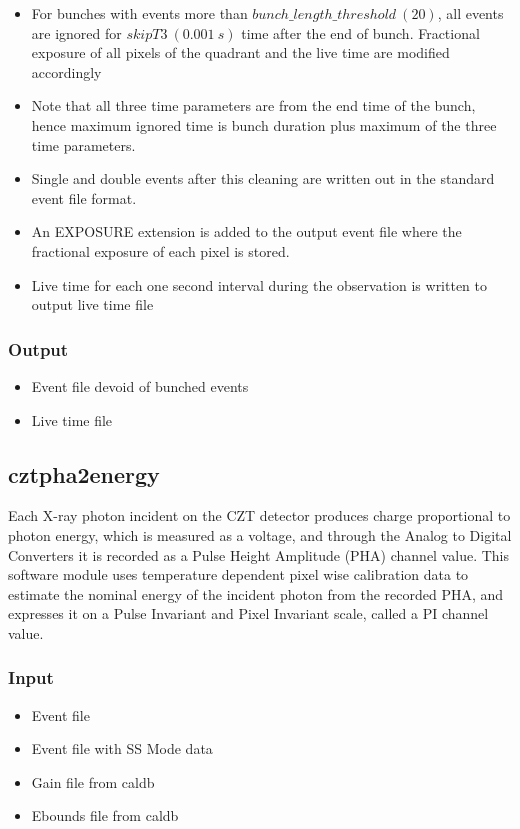 \documentclass[11pt,oneside,a4paper]{article}
\begin{document}
\begin{itemize}
\item{For bunches with events more than $bunch\_length\_threshold ~(20)$, all events
are ignored for  $skipT3 ~(0.001~s)$ time after the end of bunch. Fractional exposure 
of all pixels of the quadrant and the live time are modified accordingly}

\item{Note that all three time parameters are from the end time of the bunch, hence
maximum ignored time is bunch duration plus maximum of the three time parameters.}

\item{Single and double events after this cleaning are written out in the standard
event file format.}

\item{An EXPOSURE extension is added to the output event file where the
fractional exposure of each pixel is stored.}

\item{Live time for each one second interval during the observation is written to 
output live time file}

\end{itemize}
\subsubsection*{Output}
\begin{itemize}
\item{Event file devoid of bunched events}
\item{Live time file}    
\end{itemize}

\subsection{cztpha2energy}
Each  X-ray  photon incident on  the  CZT  
detector produces charge proportional to photon energy, which is measured  as  a  voltage, and  through  the  
Analog to Digital  Converters  it is  recorded  as  a  Pulse Height  Amplitude   (PHA)   channel   value.     
This   software   module   uses   temperature dependent pixel wise calibration  data  
to  estimate  the  nominal  energy  of  the  incident
photon  from  the  recorded  PHA, and  expresses  it  on  a  Pulse Invariant  and  Pixel Invariant  scale,  called  a  PI  channel  value. 

\subsubsection*{Input}
\renewcommand\labelitemi{{\boldmath$\cdot$}}
\begin{itemize}
\item{Event file}
\item{Event file with SS Mode data}
\item{Gain file from caldb}
\item{Ebounds file from caldb}
\end{itemize}
\end{document}
